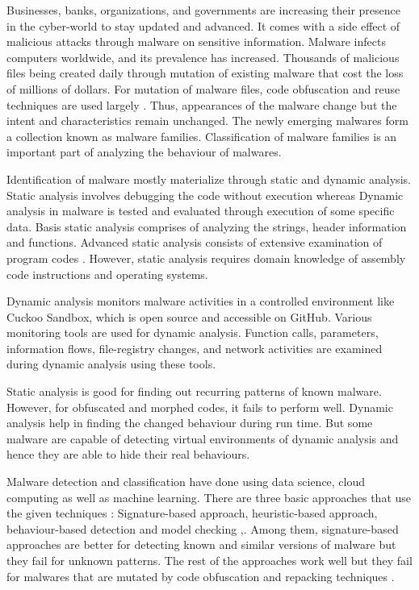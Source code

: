 \documentclass[pdflatex,sn-mathphys]{sn-jnl}%
\begin{document}
Businesses, banks, organizations, and governments are increasing their presence in the cyber-world to stay updated and advanced. It comes with a side effect of malicious attacks through malware on sensitive information. Malware infects computers worldwide, and its prevalence has increased. Thousands of malicious files being created daily through mutation of existing malware that cost the loss of millions of dollars. \color{blue}For mutation of malware files, code obfuscation and reuse techniques are used largely \cite{41}. Thus, appearances of the malware change but the intent and characteristics remain unchanged. The newly emerging malwares form a collection known as malware families. Classification of malware families is an important part of analyzing the behaviour of malwares. 
\par Identification of malware mostly materialize through static and dynamic analysis. Static analysis involves debugging the code without execution whereas Dynamic analysis in malware is tested and evaluated through execution of some specific data.  
Basis static analysis comprises of analyzing the strings, header information and functions. Advanced static analysis consists of extensive examination of program codes \cite{40}. However, static analysis requires domain knowledge of assembly code instructions and operating systems. 
\par Dynamic analysis monitors malware activities in a controlled environment like Cuckoo Sandbox, which is open source and accessible on GitHub. Various monitoring tools are used for dynamic analysis. Function calls, parameters, information flows, file-registry changes, and network activities are examined during dynamic analysis using these tools. 
\par Static analysis is good for finding out recurring patterns of known malware. However, for obfuscated and morphed codes, it fails to perform well. Dynamic analysis help in finding the changed behaviour during run time. But some malware are capable of detecting virtual environments of dynamic analysis and hence they are able to hide their real behaviours.
\par 
Malware detection and classification have done using data science, cloud computing as well as machine learning. There are three basic approaches that use the given techniques : Signature-based approach, heuristic-based approach, behaviour-based detection and model checking \cite{42},\cite{43}. Among them, signature-based approaches are better for detecting known and similar versions of malware but they fail for unknown patterns. The rest of the approaches work well but they fail for malwares that are mutated by code obfuscation and repacking techniques \cite{40}.
\end{document}
